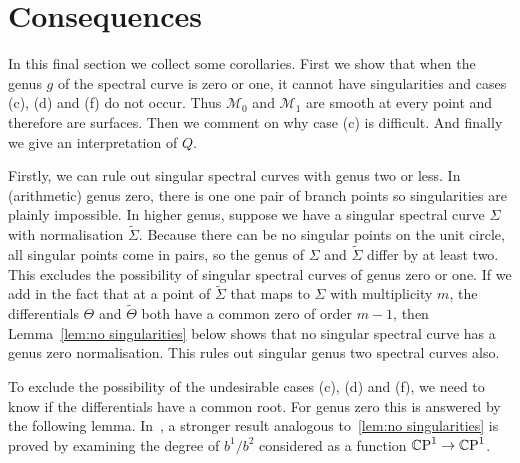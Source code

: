 \documentclass{article}
\begin{document}
\section{Consequences}

In this final section we collect some corollaries. First we show that when the genus $g$ of the spectral curve is zero or one, it cannot have singularities and cases (c), (d) and (f) do not occur. Thus $\mathcal{M}_0$ and $\mathcal{M}_1$ are smooth at every point and therefore are surfaces. Then we comment on why case (c) is difficult. And finally we give an interpretation of $Q$.

Firstly, we can rule out singular spectral curves with genus two or less. In (arithmetic) genus zero, there is one one pair of branch points so singularities are plainly impossible. In higher genus, suppose we have a singular spectral curve $\Sigma$ with normalisation $\tilde{\Sigma}$.
Because there can be no singular points on the unit circle, all singular points come in pairs, so the genus of $\Sigma$ and $\tilde{\Sigma}$ differ by at least two. This excludes the possibility of singular spectral curves of genus zero or one. If we add in the fact that at a point of $\tilde{\Sigma}$ that maps to $\Sigma$ with multiplicity $m$, the differentials $\Theta$ and $\tilde{\Theta}$ both have a common zero of order $m-1$, then Lemma~\ref{lem:no singularities} below shows that no singular spectral curve has a genus zero normalisation. This rules out singular genus two spectral curves also.

To exclude the possibility of the undesirable cases (c), (d) and (f), we need to know if the differentials have a common root. For genus zero this is answered by the following lemma. 
In~\cite{Carberry2016}, a stronger result analogous to~\ref{lem:no singularities} is proved by examining the degree of $b^1/b^2$ considered as a function $\mathbb{C}\text{P}^1 \to \mathbb{C}\text{P}^1$.
\end{document}
